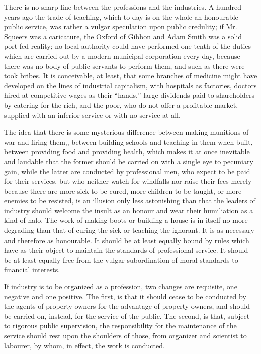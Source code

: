 \documentclass{book}
\begin{document}
There is no sharp line between the professions and the industries. A hundred years ago the trade of teaching, which to-day is on the whole an honourable public service, was rather a vulgar speculation upon public credulity; if Mr. Squeers was a caricature, the Oxford of Gibbon and Adam Smith was a solid port-fed reality; no local authority could have performed one-tenth of the duties which are carried out by a modern municipal corporation every day, because there was no body of public servants to perform them, and such as there were took bribes. It is conceivable, at least, that some branches of medicine might have developed on the lines of industrial capitalism, with hospitals as factories, doctors hired at competitive wages as their “hands,” large dividends paid to shareholders by catering for the rich, and the poor, who do not offer a profitable market, supplied with an inferior service or with no service at all.

The idea that there is some mysterious difference between making munitions of war and firing them,, between building schools and teaching in them when built, between providing food and providing health, which makes it at once inevitable and laudable that the former should be carried on with a single eye to pecuniary gain, while the latter are conducted by professional men, who expect to be paid for their services, but who neither watch for windfalls nor raise their fees merely because there are more sick to be cured, more children to be taught, or more enemies to be resisted, is an illusion only less astonishing than that the leaders of industry should welcome the insult as an honour and wear their humiliation as a kind of halo. The work of making boots or building a house is in itself no more degrading than that of curing the sick or teaching the ignorant. It is as necessary and therefore as honourable. It should be at least equally bound by rules which have as their object to maintain the standards of professional service. It should be at least equally free from the vulgar subordination of moral standards to financial interests.

If industry is to be organized as a profession, two changes are requisite, one negative and one positive. The first, is that it should cease to be conducted by the agents of property-owners for the advantage of property-owners, and should be carried on, instead, for the service of the public. The second, is that, subject to rigorous public supervision, the responsibility for the maintenance of the service should rest upon the shoulders of those, from organizer and scientist to labourer, by whom, in effect, the work is conducted.
\end{document}
